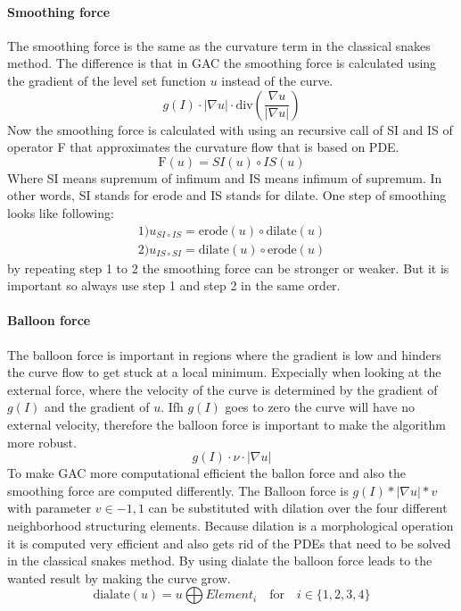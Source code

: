 \paragraph{Smoothing force}
The smoothing force is the same as the curvature term in the classical snakes method. The difference is that in GAC the smoothing force is calculated using the gradient of the level set function $u$ instead of the curve. 
\begin{equation}
    g(I) \cdot |\nabla u| \cdot \text{div} \left(\frac{\nabla u}{|\nabla u|}\right)
\end{equation}
Now the smoothing force is calculated with using an recursive call of SI and IS of operator F that approximates the curvature flow that is based on PDE. 
\begin{equation}
    \text{F}(u) = SI(u)\circ IS (u)
    \label{eq:smoothingforce}
\end{equation}
Where SI means supremum of infimum and IS means infimum of supremum. In other words, SI stands for erode and IS stands for dilate. One step of smoothing looks like following: 
\begin{align*}
    1) u_{SI\circ IS}=\text{erode}(u) \circ \text{dilate}(u) \\
    2) u_{IS\circ SI}=\text{dilate}(u) \circ \text{erode}(u)
\end{align*}
by repeating step 1 to 2 the smoothing force can be stronger or weaker. But it is important so always use step 1 and step 2 in the same order. 


\paragraph{Balloon force}
The balloon force is important in regions where the gradient is low and hinders the curve flow to get stuck at a local minimum. Expecially when looking at the external force, where the velocity of the curve is determined by the gradient of $g(I)$ and the gradient of $u$. Ifh $g(I)$ goes to zero the curve will have no external velocity, therefore the balloon force is important to make the algorithm more robust.
\begin{equation}
    g(I) \cdot \nu \cdot |\nabla u|
\end{equation}
To make GAC more computational efficient the ballon force and also the smoothing force are computed differently. 
The Balloon force is $g(I)*|\nabla u| *v$ with parameter $v \in  {-1,1}$ can be substituted with dilation over the four different neighborhood structuring elements. Because dilation is a morphological operation it is computed very efficient and also gets rid of the PDEs that need to be solved in the classical snakes method. By using dialate the balloon force leads to the wanted result by making the curve grow. 
\begin{equation}
    \text{dialate}(u)  =  u \bigoplus Element_i \quad \text{for} \quad i \in \{1,2,3,4\}
    \label{dialate}
\end{equation}

